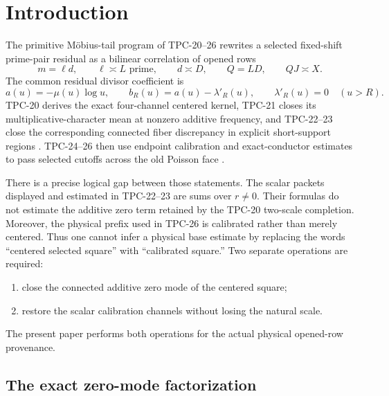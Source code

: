\section{Introduction}
\label{sec:tpc27-introduction}

The primitive M\"obius-tail program of TPC-20--26 rewrites a selected
fixed-shift prime-pair residual as a bilinear correlation of opened rows
\[
 m=\ell d,
 \qquad \ell\asymp L\text{ prime},
 \qquad d\asymp D,
 \qquad Q=LD,
 \qquad QJ\asymp X.
\]
The common residual divisor coefficient is
\begin{equation}
 a(u)=-\mu(u)\log u,
 \qquad
 b_R(u)=a(u)-\lambda'_R(u),
 \qquad
 \lambda'_R(u)=0\quad(u>R).
 \label{eq:tpc27-intro-coefficients}
\end{equation}
TPC-20 derives the exact four-channel centered kernel, TPC-21 closes
its multiplicative-character mean at nonzero additive frequency, and
TPC-22--23 close the corresponding connected fiber discrepancy in
explicit short-support regions
\citep{WangTPC20,WangTPC21,WangTPC22,WangTPC23}.  TPC-24--26 then use
endpoint calibration and exact-conductor estimates to pass selected
cutoffs across the old Poisson face
\citep{WangTPC24,WangTPC25,WangTPC26}.

There is a precise logical gap between those statements.  The scalar
packets displayed and estimated in TPC-22--23 are sums over
\(r\ne0\).  Their formulas do not estimate the additive zero term
retained by the TPC-20 two-scale completion.  Moreover, the physical
prefix used in TPC-26 is calibrated rather than merely centered.  Thus
one cannot infer a physical base estimate by replacing the words
``centered selected square'' with ``calibrated square.''  Two separate
operations are required:
\begin{enumerate}[label=\textup{(\roman*)}]
 \item close the connected additive zero mode of the centered square;
 \item restore the scalar calibration channels without losing the
 natural scale.
\end{enumerate}
The present paper performs both operations for the actual physical
opened-row provenance.

\subsection{The exact zero-mode factorization}

